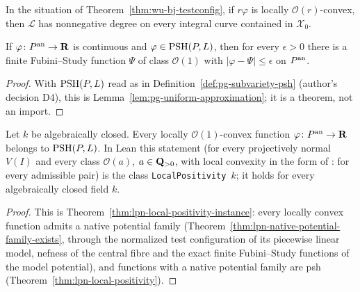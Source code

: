 \begin{theorem}\label{thm:wu-cld-nef}
\notready
{}
In the situation of Theorem~\ref{thm:wu-bj-testconfig}, if $r\varphi$ is locally $\mathcal O(r)$-convex, then
$\mathcal L$ has nonnegative degree on every integral curve contained in $\mathcal X_0$.
\end{theorem}

\begin{theorem}\label{thm:wu-bj-uniform}
\leanok
{}
If $\varphi\colon P^{\mathrm{an}}\to\mathbf{R}$ is continuous and $\varphi\in\operatorname{PSH}(P,L)$, then for every $\epsilon>0$ there is a finite
Fubini--Study function $\Psi$ of class $\mathcal O(1)$ with $|\varphi-\Psi|\le\epsilon$ on $P^{\mathrm{an}}$.
\end{theorem}

\begin{proof}
With $\operatorname{PSH}(P,L)$ read as in Definition~\ref{def:pg-subvariety-psh} (author's decision D4), this is
Lemma~\ref{lem:pg-uniform-approximation}; it is a theorem, not an import.
\end{proof}

\begin{lemma}\label{lem:wu-local-positivity}
\leanok
{}
Let $k$ be algebraically closed. Every locally $\mathcal O(1)$-convex function $\varphi\colon P^{\mathrm{an}}\to\mathbf{R}$ belongs to
$\operatorname{PSH}(P,L)$. In Lean this statement (for every projectively normal $V(I)$ and every class $\mathcal O(a)$, $a\in\mathbf{Q}_{>0}$,
with local convexity in the form of \cite[Definition~5.3]{FHX}: for every admissible pair) is the class
\texttt{LocalPositivity}~$k$; it holds for every algebraically closed field $k$.
\end{lemma}

\begin{proof}
This is Theorem~\ref{thm:lpn-local-positivity-instance}: every locally convex function admits a native potential
family (Theorem~\ref{thm:lpn-native-potential-family-exists}, through the normalized test configuration of its
piecewise linear model, nefness of the central fibre and the exact finite Fubini--Study functions of the model
potential), and functions with a native potential family are psh (Theorem~\ref{thm:lpn-local-positivity}).
\end{proof}

